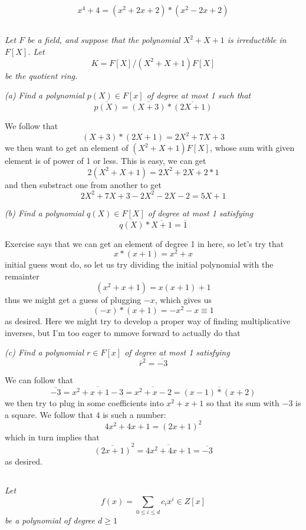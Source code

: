\documentclass[11pt,oneside,titlepage]{book}
\begin{document}
$$x^4 + 4 = (x^2 + 2x + 2) * (x^2 - 2x + 2)$$

\subsection{}

\textit{Let $F$ be a field, and suppose that the polynomial $X^2 + X +
1$ is irreductible in $F[X]$. Let
  $$K = F[X] / (X^2 + X + 1)F[X]$$
  be the quotient ring.}

\textit{(a) Find a polynomial $p(X) \in F[x]$ of degree at most 1 such
that
  $$\overline{p(X)} = \overline{(X + 3)} * \overline{(2X + 1)}$$
}

We follow that
$$(X + 3) * (2X + 1) = 2X^2 + 7X + 3$$
we then want to get an element of $(X^2 + X + 1)F[X]$, whose sum with
given element is of power of 1 or less. This is easy, we can get
$$2(X^2 + X + 1) = 2X^2 + 2X + 2 * 1$$
and then substract one from another to get
$$2X^2 + 7X + 3 - 2X^2 - 2X - 2 = 5X + 1$$

\textit{(b) Find a polynomial $q(X) \in F[X]$ of degree at most 1
satisfying
  $$\overline{q(X)} * \overline{X + 1} = \overline{1}$$
}

Exercise says that we can get an element of degree 1 in here, so let's
try that
$$x * (x + 1) = x^2  + x$$
initial guess wont do, so let us try dividing the initial polynomial
with the remainter
$$(x^2 + x + 1) = x(x + 1) + 1$$
thus we might get a guess of plugging $-x$, which gives us
$$(-x) * (x + 1) = -x^2 - x \equiv 1$$
as desired. Here we might try to develop a proper way of finding
multiplicative inverses, but I'm too eager to mmove forward to
actually do that


\textit{(c) Find a polynomial $r \in F[x]$ of degree at most 1
satisfying
  $$\overline{r}^2 = \overline{- 3}$$
}

We can follow that
$$\overline{- 3} = \overline{x^2 + x + 1 - 3} =
\overline{x^2 + x - 2} = \overline{(x - 1) * (x + 2)}$$ we then try to
plug in some coefficients into $x^2 + x + 1$ so that its sum with $-3$
is a square. We follow that $4$ is such a number:
$$4x^2 + 4x + 1 = (2x + 1)^2$$
which in turn implies that
$$\overline{(2x + 1)}^2 = \overline{4x^2 + 4x + 1} = \overline{-3}$$
as desired.

\subsection{}

\textit{Let
  $$f(x) = \sum_{0 \leq i \leq d}{c_i x^i} \in Z[x]$$
  be a polynomial of degree $d \geq 1$}
\end{document}
